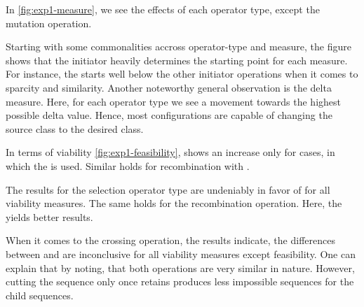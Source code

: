 \documentclass[./../../paper.tex]{subfiles}
\begin{document}
In \autoref{fig:exp1-measure}, we see the effects of each operator type, except the mutation operation. 

Starting with some commonalities accross operator-type and measure, the figure shows that the initiator heavily determines the starting point for each measure. For instance, the  starts well below the other initiator operations when it comes to sparcity and similarity. 
Another noteworthy general observation is the delta measure. Here, for each operator type we see a movement towards the highest possible delta value. Hence, most configurations are capable of changing the source class to the desired class. 

In terms of viability \autoref{fig:exp1-feasibility}, shows an increase only for cases, in which the  is used. Similar holds for recombination with .

The results for the selection operator type are undeniably in favor of  for all viability measures. The same holds for the recombination operation. Here, the  yields better results.

When it comes to the crossing operation, the results indicate, the differences between  and  are inconclusive for all viability measures except feasibility. One can explain that by noting, that both operations are very similar in nature. However, cutting the sequence only once retains produces less impossible sequences for the child sequences.



\end{document}
